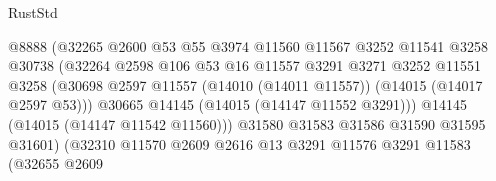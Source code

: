 \begin{lexlean}{RustStd}
\begin{coremodule}
                                          @8888
                                          (@32265
                                            @2600
                                            @53
                                            @55
                                            @3974
                                            @11560
                                            @11567
                                            @3252
                                            @11541
                                            @3258
                                            @30738
                                            (@32264
                                              @2598
                                              @106
                                              @53
                                              @16
                                              @11557
                                              @3291
                                              @3271
                                              @3252
                                              @11551
                                              @3258
                                              (@30698
                                                @2597
                                                @11557
                                                (@14010 (@14011 @11557))
                                                (@14015 (@14017 @2597 @53)))
                                              @30665
                                              @14145
                                              (@14015 (@14147 @11552 @3291)))
                                            @14145
                                            (@14015 (@14147 @11542 @11560)))
                                          @31580
                                          @31583
                                          @31586
                                          @31590
                                          @31595
                                          @31601)
                                        (@32310
                                          @11570
                                          @2609
                                          @2616
                                          @13
                                          @3291
                                          @11576
                                          @3291
                                          @11583
                                          (@32655
                                            @2609

\end{coremodule}
\end{lexlean}
